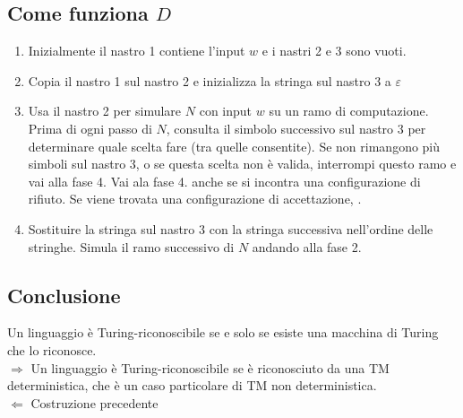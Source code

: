 \subsection{Come funziona $D$}
\begin{enumerate}
   \item Inizialmente il nastro 1 contiene l'input $w$ e i nastri 2 e 3 sono vuoti. 
   \item Copia il nastro 1 sul nastro 2 e inizializza la stringa sul nastro 3 a $\varepsilon$ 
   \item Usa il nastro 2 per simulare $N$ con input $w$ su un ramo di computazione.
      Prima di ogni passo di $N$, consulta il simbolo successivo sul nastro 3 per determinare quale scelta fare (tra quelle consentite).
      Se non rimangono più simboli sul nastro 3, o se questa scelta non è valida, interrompi questo ramo e vai alla fase 4. 
      Vai ala fase 4. anche se si incontra una configurazione di rifiuto.
      Se viene trovata una configurazione di accettazione, .
   \item Sostituire la stringa sul nastro 3 con la stringa successiva nell'ordine delle stringhe. Simula il ramo successivo di $N$ andando alla fase 2. 
\end{enumerate}

\subsection{Conclusione}
\begin{corollary}
   Un linguaggio è Turing-riconoscibile se e solo se esiste una macchina di Turing  che lo riconosce.\\
   $\Rightarrow$ Un linguaggio è Turing-riconoscibile se è riconosciuto da una TM deterministica, che è un caso particolare di TM non deterministica. \\
   $\Leftarrow$ Costruzione precedente 
\end{corollary}

